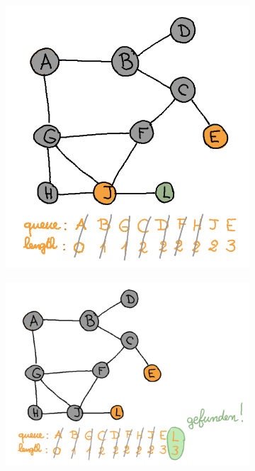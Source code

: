 \begin{enumerate}[(a)]
\begin{figure}[H]
\begin{subfigure}[h]{0.45\textwidth}
    \end{subfigure}
    \qquad
    \begin{subfigure}[h]{0.45\textwidth}
    \raggedleft
    \includegraphics[width=\textwidth]{Pictures/SP/panda_gebissen_7.png}
    \end{subfigure}
\end{figure}
\begin{figure}[H]\ContinuedFloat
	\centering
    \begin{subfigure}[h]{0.6\textwidth}
    \includegraphics[width=\textwidth]{Pictures/SP/panda_gebissen_8.png}

\end{subfigure}
\end{figure}
\end{enumerate}
